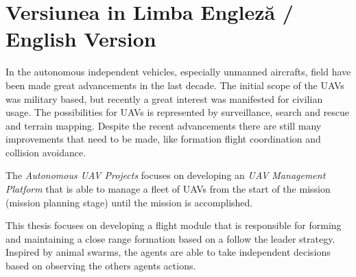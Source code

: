 
\section{Versiunea in Limba Engleză / English Version}
In the autonomous independent vehicles, especially unmanned aircrafts, field
have been made great advancements in the last decade. The initial scope of
the UAVs was military based, but recently a great interest was manifested
for civilian usage. The possibilities for UAVs is represented by surveillance, 
search and rescue and terrain mapping. Despite the recent advancements there
are still many improvements that need to be made, like formation flight coordination
and collision avoidance.

The \textit{Autonomous UAV Projects} focuses on developing an \textit{UAV 
Management Platform} that is able to manage a fleet of UAVs from the start of 
the mission (mission planning stage) until the mission is accomplished.

This thesis focuses on developing a flight module that is responsible
for forming and maintaining a close range formation based on a follow the leader
strategy. Inspired by animal swarms, the agents are able to take independent
decisions based on observing the others agents actions.

